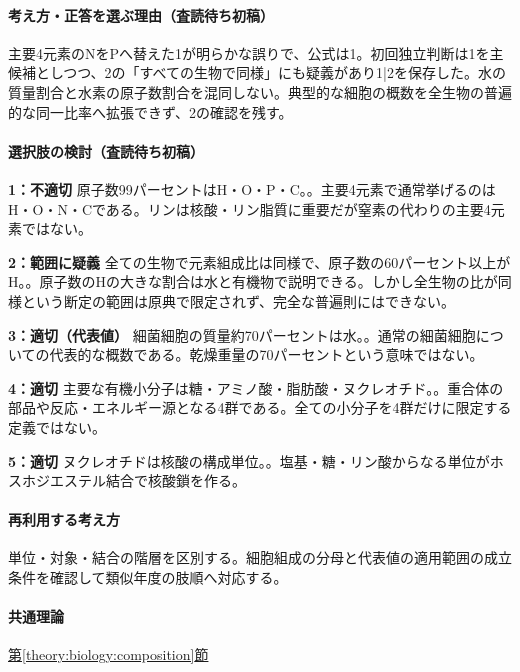\paragraph{考え方・正答を選ぶ理由（査読待ち初稿）} 主要4元素のNをPへ替えた1が明らかな誤りで、公式は1。初回独立判断は1を主候補としつつ、2の「すべての生物で同様」にも疑義があり1|2を保存した。水の質量割合と水素の原子数割合を混同しない。典型的な細胞の概数を全生物の普遍的な同一比率へ拡張できず、2の確認を残す。

\paragraph{選択肢の検討（査読待ち初稿）}\mbox{}\par

\noindent\textbf{1：不適切} 原子数99パーセントはH・O・P・C。。主要4元素で通常挙げるのはH・O・N・Cである。リンは核酸・リン脂質に重要だが窒素の代わりの主要4元素ではない。\par

\noindent\textbf{2：範囲に疑義} 全ての生物で元素組成比は同様で、原子数の60パーセント以上がH。。原子数のHの大きな割合は水と有機物で説明できる。しかし全生物の比が同様という断定の範囲は原典で限定されず、完全な普遍則にはできない。\par

\noindent\textbf{3：適切（代表値）} 細菌細胞の質量約70パーセントは水。。通常の細菌細胞についての代表的な概数である。乾燥重量の70パーセントという意味ではない。\par

\noindent\textbf{4：適切} 主要な有機小分子は糖・アミノ酸・脂肪酸・ヌクレオチド。。重合体の部品や反応・エネルギー源となる4群である。全ての小分子を4群だけに限定する定義ではない。\par

\noindent\textbf{5：適切} ヌクレオチドは核酸の構成単位。。塩基・糖・リン酸からなる単位がホスホジエステル結合で核酸鎖を作る。\par

\paragraph{再利用する考え方} 単位・対象・結合の階層を区別する。細胞組成の分母と代表値の適用範囲の成立条件を確認して類似年度の肢順へ対応する。

\paragraph{共通理論} \hyperref[theory:biology:composition]{第\ref*{theory:biology:composition}節}

